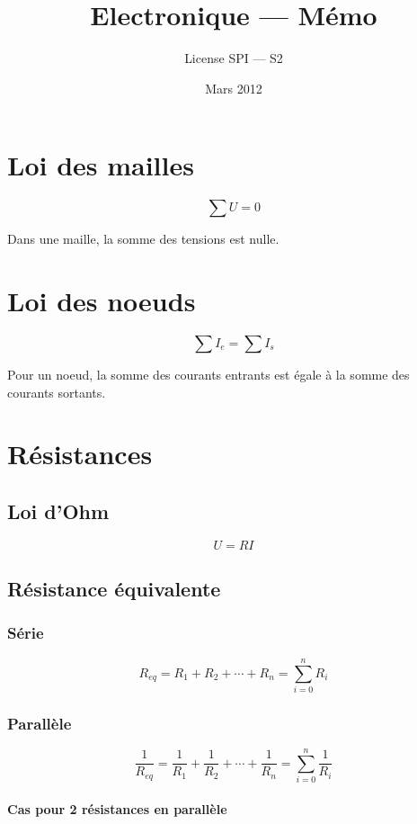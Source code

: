 \documentclass[a4paper, 11pt]{article}
\title{Electronique — Mémo}
\author{License SPI — S2}
\date{Mars 2012}
\begin{document}
    \maketitle

    \section*{Loi des mailles}

    $$\sum U = 0$$

    Dans une maille, la somme des tensions est nulle.

    \section{Loi des noeuds}

    $$\sum I_e = \sum I_s$$

    Pour un noeud, la somme des courants entrants est égale à la somme des courants sortants.

    \section{Résistances}

        \subsection{Loi d'Ohm}

        $$U=RI$$

        \subsection{Résistance équivalente}

        \subsubsection{Série}

        $$R_{eq} = R_1 + R_2 + \cdots + R_n = \sum_{i=0}^n R_i$$

        \subsubsection{Parallèle}

        $$\frac{1}{R_{eq}} = \frac{1}{R_1} + \frac{1}{R_2} + \cdots + \frac{1}{R_n} = \sum_{i=0}^n \frac{1}{R_i}$$

        \paragraph{Cas pour 2 résistances en parallèle}
\end{document}
